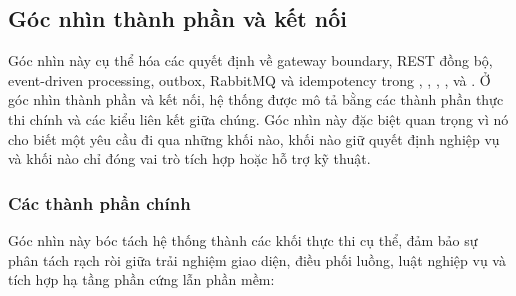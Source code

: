 \subsection{Góc nhìn thành phần và kết nối}\label{sec:component-connector-view}

Góc nhìn này cụ thể hóa các quyết định về gateway boundary, REST đồng bộ, event-driven processing, outbox, RabbitMQ và idempotency trong , , , ,  và .
Ở góc nhìn thành phần và kết nối, hệ thống được mô tả bằng các thành phần thực thi chính và các kiểu liên kết giữa chúng. Góc nhìn này đặc biệt quan trọng vì nó cho biết một yêu cầu đi qua những khối nào, khối nào giữ quyết định nghiệp vụ và khối nào chỉ đóng vai trò tích hợp hoặc hỗ trợ kỹ thuật.

\subsubsection{Các thành phần chính}\label{sec:main-components}
Góc nhìn này bóc tách hệ thống thành các khối thực thi cụ thể, đảm bảo sự phân tách rạch ròi giữa trải nghiệm giao diện, điều phối luồng, luật nghiệp vụ và tích hợp hạ tầng phần cứng lẫn phần mềm:

